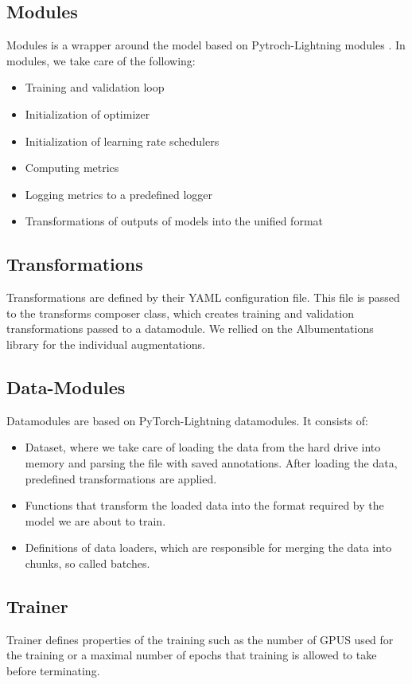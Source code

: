 \subsection{Modules}
Modules is a wrapper around the model based on Pytroch-Lightning modules \cite{falcon2019pytorch}. In modules, we take care of the following:
\begin{itemize}
    \item Training and validation loop
    \item Initialization of optimizer
    \item Initialization of learning rate schedulers
    \item Computing metrics
    \item Logging metrics to a predefined logger
    \item Transformations of outputs of models into the unified format
\end{itemize}


\subsection{Transformations}
Transformations are defined by their YAML configuration file. This file is passed to the transforms composer class, which creates training and validation transformations passed to a datamodule. We rellied on the Albumentations library for the individual augmentations.

\subsection{Data-Modules}
Datamodules are based on PyTorch-Lightning datamodules. It consists of:
\begin{itemize}
    \item Dataset, where we take care of loading the data from the hard drive into memory and parsing the file with saved annotations. After loading the data, predefined transformations are applied.
    \item Functions that transform the loaded data into the format required by the model we are about to train.
    \item Definitions of data loaders, which are responsible for merging the data into chunks, so called batches.
\end{itemize}
\subsection{Trainer}
Trainer defines properties of the training such as the number of GPUS used for the training or a maximal number of epochs that training is allowed to take before terminating.

